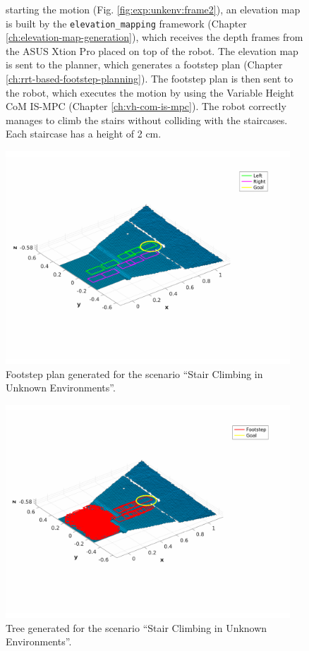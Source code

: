 \begin{figure}
{      starting the motion (Fig. \ref{fig:exp:unkenv:frame2}), an
      elevation map is built by the \texttt{elevation\_mapping} framework
      (Chapter \ref{ch:elevation-map-generation}),
      which receives the depth frames from the ASUS Xtion Pro placed 
      on top of the robot. The elevation map is sent to the planner, which 
      generates a footstep plan (Chapter \ref{ch:rrt-based-footstep-planning}).
      The footstep plan is then sent to the 
      robot, which executes the motion by using the Variable Height CoM
      IS-MPC (Chapter \ref{ch:vh-com-is-mpc}). The robot correctly manages to 
      climb the stairs without colliding with the staircases. Each staircase 
      has a height of 2 cm.}
  \label{fig:experiments:unkenv:videoframes}
\end{figure}

\begin{figure}
    \centering
    \includegraphics[width=0.95\textwidth]
        {figures/experiments/unknown-env/footstep-plan.pdf}
    \caption{Footstep plan generated for the scenario ``Stair Climbing in 
        Unknown Environments''.}
    \label{fig:experiments:unknown-env:footstep-plan}
\end{figure}
\begin{figure}
    \centering
    \includegraphics[width=0.95\textwidth]
        {figures/experiments/unknown-env/rrt-tree.pdf}
    \caption{Tree generated for the scenario ``Stair Climbing in 
        Unknown Environments''.}
    \label{fig:experiments:unknown-env:rrt-tree}
\end{figure}

